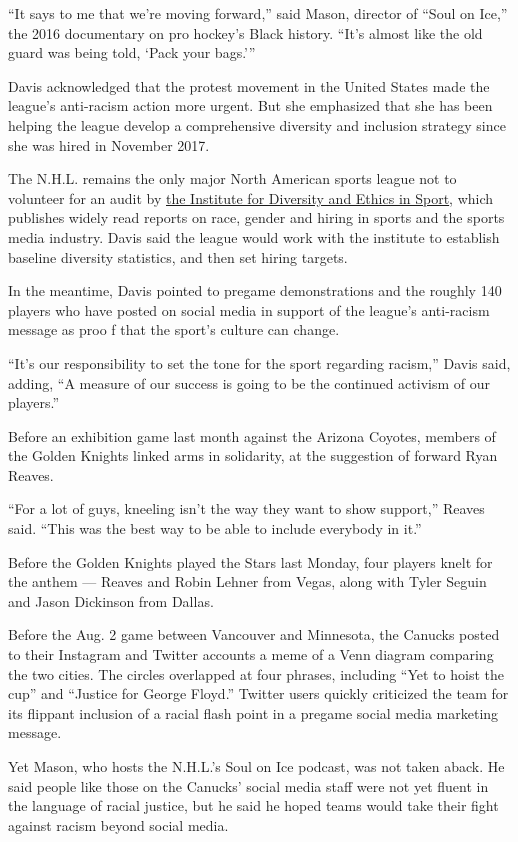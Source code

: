 ``It says to me that we're moving forward,'' said Mason, director of
``Soul on Ice,'' the 2016 documentary on pro hockey's Black history.
``It's almost like the old guard was being told, `Pack your bags.'''

Davis acknowledged that the protest movement in the United States made
the league's anti-racism action more urgent. But she emphasized that she
has been helping the league develop a comprehensive diversity and
inclusion strategy since she was hired in November 2017.

The N.H.L. remains the only major North American sports league not to
volunteer for an audit by \href{https://www.tidesport.org/}{the
Institute for Diversity and Ethics in Sport}, which publishes widely
read reports on race, gender and hiring in sports and the sports media
industry. Davis said the league would work with the institute to
establish baseline diversity statistics, and then set hiring targets.

In the meantime, Davis pointed to pregame demonstrations and the roughly
140 players who have posted on social media in support of the league's
anti-racism message as proo f that the sport's culture can change.

``It's our responsibility to set the tone for the sport regarding
racism,'' Davis said, adding, ``A measure of our success is going to be
the continued activism of our players.''

Before an exhibition game last month against the Arizona Coyotes,
members of the Golden Knights linked arms in solidarity, at the
suggestion of forward Ryan Reaves.

``For a lot of guys, kneeling isn't the way they want to show support,''
Reaves said. ``This was the best way to be able to include everybody in
it.''

Before the Golden Knights played the Stars last Monday, four players
knelt for the anthem --- Reaves and Robin Lehner from Vegas, along with
Tyler Seguin and Jason Dickinson from Dallas.

Before the Aug. 2 game between Vancouver and Minnesota, the Canucks
posted to their Instagram and Twitter accounts a meme of a Venn diagram
comparing the two cities. The circles overlapped at four phrases,
including ``Yet to hoist the cup'' and ``Justice for George Floyd.''
Twitter users quickly criticized the team for its flippant inclusion of
a racial flash point in a pregame social media marketing message.

Yet Mason, who hosts the N.H.L.'s Soul on Ice podcast, was not taken
aback. He said people like those on the Canucks' social media staff were
not yet fluent in the language of racial justice, but he said he hoped
teams would take their fight against racism beyond social media.

